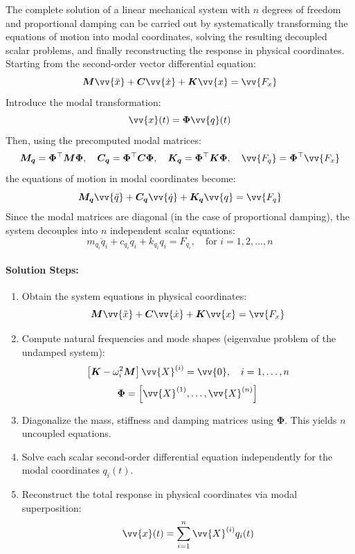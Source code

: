 The complete solution of a linear mechanical system with \( n \) degrees of freedom and proportional damping can be carried out by systematically transforming the equations of motion into modal coordinates, solving the resulting decoupled scalar problems, and finally reconstructing the response in physical coordinates. Starting from the second-order vector differential equation:
\[
\boldsymbol{M} \vv{\ddot{x}} + \boldsymbol{C} \vv{\dot{x}} + \boldsymbol{K} \vv{x} = \vv{F_x}
\]
Introduce the modal transformation:
\[
\vv{x}(t) = \boldsymbol{\Phi} \vv{q}(t)
\]
Then, using the precomputed modal matrices:
\[
\boldsymbol{M_q} = \boldsymbol{\Phi}^\top \boldsymbol{M} \boldsymbol{\Phi}, \quad
\boldsymbol{C_q} = \boldsymbol{\Phi}^\top \boldsymbol{C} \boldsymbol{\Phi}, \quad
\boldsymbol{K_q} = \boldsymbol{\Phi}^\top \boldsymbol{K} \boldsymbol{\Phi}, \quad
\vv{F_q} = \boldsymbol{\Phi}^\top \vv{F_x}
\]
the equations of motion in modal coordinates become:
\[
\boldsymbol{M_q} \vv{\ddot{q}} + \boldsymbol{C_q} \vv{\dot{q}} + \boldsymbol{K_q} \vv{q} = \vv{F_q}
\]
Since the modal matrices are diagonal (in the case of proportional damping), the system decouples into \( n \) independent scalar equations:
\[
m_{q_i} \ddot{q}_i + c_{q_i} \dot{q}_i + k_{q_i} q_i = F_{q_i}, \quad \text{for } i = 1, 2, \dots, n
\]

\paragraph{Solution Steps:}

\begin{enumerate}
  \item Obtain the system equations in physical coordinates:
  \[
  \boldsymbol{M} \vv{\ddot{x}} + \boldsymbol{C} \vv{\dot{x}} + \boldsymbol{K} \vv{x} = \vv{F_x}
  \]  
  \item Compute natural frequencies and mode shapes (eigenvalue problem of the undamped system):
  \[
  \left[ \boldsymbol{K} - \omega_i^2 \boldsymbol{M} \right] \vv{X}^{(i)} = \vv{0}, \quad i = 1,\dots,n
  \]
  \[
  \boldsymbol{\Phi} = \left[ \vv{X}^{(1)}, \dots, \vv{X}^{(n)} \right]
  \]
  \item Diagonalize the mass, stiffness and damping matrices using \( \boldsymbol{\Phi} \). This yields \( n \) uncoupled equations.
  \item Solve each scalar second-order differential equation independently for the modal coordinates \( q_i(t) \).
  \item Reconstruct the total response in physical coordinates via modal superposition:
  \[
  \vv{x}(t) = \sum_{i=1}^n \vv{X}^{(i)} q_i(t)
  \]
\end{enumerate}

